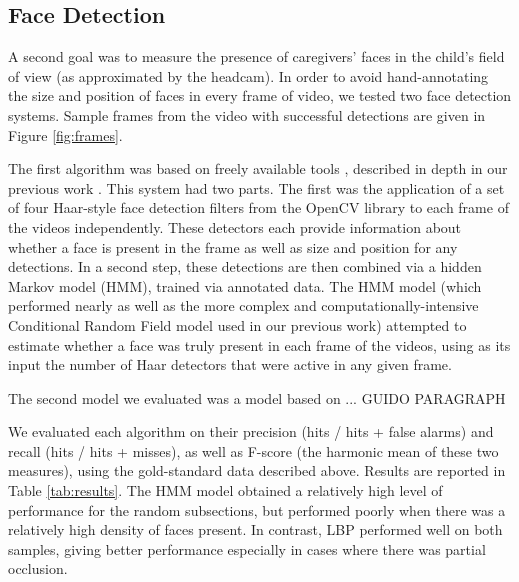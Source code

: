 \documentclass[10pt,letterpaper]{article}
\begin{document}


\subsection{Face Detection}

A second goal was to measure the presence of caregivers' faces in the child's field of view (as approximated by the headcam). In order to avoid hand-annotating the size and position of faces in every frame of video, we tested two face detection systems. Sample frames from the video with successful detections are given in Figure \ref{fig:frames}.

The first algorithm was based on freely available tools \cite{bradski2008}, described in depth in our previous work \cite{frank2012b}. This system had two parts. The first was the application of a set of four Haar-style face detection filters from the OpenCV library \cite{viola2004} to each frame of the videos independently. These detectors each provide information about whether a face is present in the frame as well as size and position for any detections. In a second step, these detections are then combined via a hidden Markov model (HMM), trained via annotated data. The HMM model (which performed nearly as well as the more complex and computationally-intensive Conditional Random Field model used in our previous work) attempted to estimate whether a face was truly present in each frame of the videos, using as its input the number of Haar detectors that were active in any given frame. 

The second model we evaluated was a model based on ... GUIDO PARAGRAPH \cite{kalal2010}



We evaluated each algorithm on their precision (hits / hits + false alarms) and recall (hits / hits + misses), as well as F-score (the harmonic mean of these two measures), using the gold-standard data described above. Results are reported in Table \ref{tab:results}. The HMM model obtained a relatively high level of performance for the random subsections, but performed poorly when there was a relatively high density of faces present. In contrast, LBP performed well on both samples, giving better performance especially in cases where there was partial occlusion.
\end{document}
